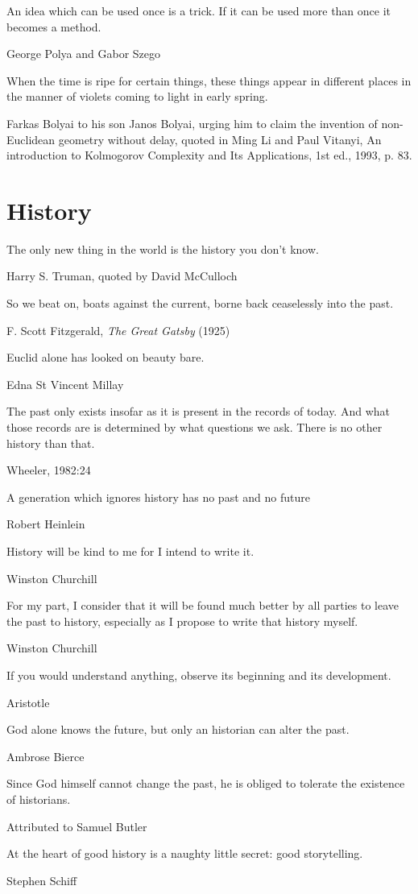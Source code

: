 \epigraph{An idea which can be used once is a trick. If it can be used more than once it becomes a method.}{George Polya and Gabor Szego}


\epigraph{When the time is ripe for certain things, these things appear in different places in the manner of violets coming to light in early spring.}{Farkas Bolyai to his son Janos Bolyai, urging him to claim the invention of non-Euclidean geometry without delay, quoted in Ming Li and Paul Vitanyi, An introduction to Kolmogorov Complexity and Its Applications, 1st ed., 1993, p. 83.}


\section{History}
\epigraph{The only new thing in the world is the history you don't know.}{Harry S. Truman, quoted by David McCulloch}

\epigraph{So we beat on, boats against the current, borne back ceaselessly into the past.}{F. Scott Fitzgerald, \emph{The Great Gatsby} (1925)}

\epigraph{Euclid alone has looked on beauty bare.}{Edna St Vincent Millay}

\epigraph{The past only exists insofar as it is present in the records of today. And what those records are is determined by what questions we ask.  There is no other history than that.}{Wheeler, 1982:24}

\epigraph{A generation which ignores history has no past and no future}{Robert Heinlein} %


\epigraph{History will be kind to me for I intend to write it.}{Winston Churchill}

\epigraph{For my part, I consider that it will be found much better by all parties to leave the past to history, especially as I propose to write that history myself.}{Winston Churchill}

\epigraph{If you would understand anything, observe its beginning and its development.}{Aristotle}

\epigraph{God alone knows the future, but only an historian can alter the past.}{Ambrose Bierce}

\epigraph{Since God himself cannot change the past, he is obliged to tolerate the existence of historians.}{Attributed to Samuel Butler}

\epigraph{At the heart of good history is a naughty little secret: good storytelling.}{Stephen Schiff}

